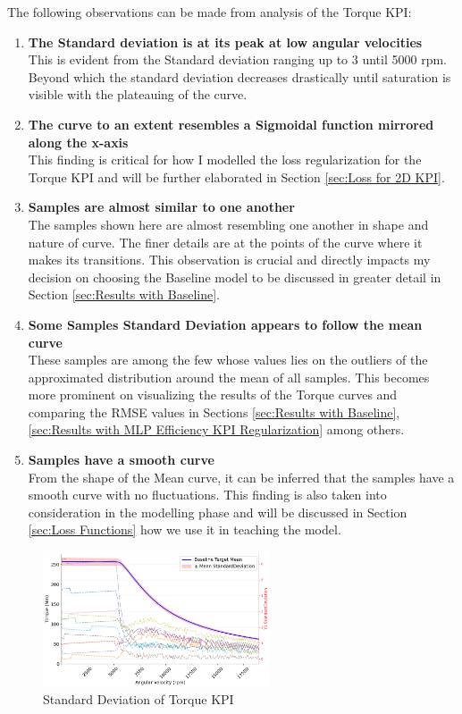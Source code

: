 \documentclass{report} %
\begin{document}
The following observations can be made from analysis of the Torque \ac{KPI}:
\begin{enumerate}[nosep]
    \item \textbf{The Standard deviation is at its peak at low angular velocities}\\
    This is evident from the Standard deviation ranging up to 3 until 5000 rpm. Beyond which the standard deviation decreases drastically until 
    saturation is visible with the plateauing of the curve.
    \item \textbf{The curve to an extent resembles a Sigmoidal function mirrored along the x-axis}\\           
    This finding is critical for how I modelled the loss regularization for the Torque \ac{KPI} and will be further elaborated in Section \ref{sec:Loss for 2D KPI}.
    \item \textbf{Samples are almost similar to one another}\\
    The samples shown here are almost resembling one another in shape and nature of curve. The finer details are at the points of the curve where it makes its transitions. 
    This observation is crucial and directly impacts my decision on choosing the Baseline model to be discussed in greater detail in Section \ref{sec:Results with Baseline}.
    \item \textbf{Some Samples Standard Deviation appears to follow the mean curve}\\
    These samples are among the few whose values lies on the outliers of the approximated distribution around the mean of all samples. This becomes more 
    prominent on visualizing the results of the Torque curves and comparing the \ac{RMSE} values in Sections \ref{sec:Results with Baseline}, 
    \ref{sec:Results with MLP Efficiency KPI Regularization} among others.
    \item \textbf{Samples have a smooth curve}\\           
    From the shape of the Mean curve, it can be inferred that the samples have a smooth curve with no fluctuations. This finding is also taken into consideration in the 
    modelling phase and will be discussed in Section \ref{sec:Loss Functions} how we use it in teaching the model.
\end{enumerate}

\begin{figure}[H]
    \centering
    \includegraphics[width=0.6\textwidth]{./ReportImages/StandardDeviation_Baseline_y1.png} 
    \caption{Standard Deviation of Torque KPI} 
    \label{fig:Standard Deviation of 2D KPI}
\end{figure}
\end{document}
